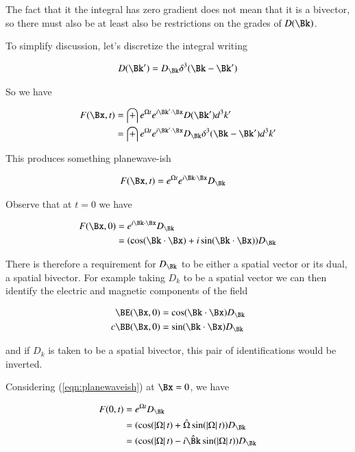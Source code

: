 The fact that it the integral has zero gradient does not mean that it is a bivector, so there must also be at least also be restrictions on the grades of $D(\Bk)$.

To simplify discussion, let's discretize the integral writing

\begin{align*}
D(\Bk') = D_\Bk \delta^3 (\Bk - \Bk')
\end{align*}

So we have

\begin{align*}
F(\Bx,t)
&= \int e^{\Omega t} e^{i \Bk' \cdot \Bx} D(\Bk') d^3 k' \\
&= \int e^{\Omega t} e^{i \Bk' \cdot \Bx} D_\Bk \delta^3(\Bk - \Bk') d^3 k' \\
\end{align*}

This produces something planewave-ish

\begin{align}\label{eqn:planewaveish}
F(\Bx,t) &= e^{\Omega t} e^{i \Bk \cdot \Bx} D_\Bk
\end{align}

Observe that at $t=0$ we have

\begin{align*}
F(\Bx,0)
&= e^{i \Bk \cdot \Bx} D_\Bk  \\
&= (\cos (\Bk \cdot \Bx) + i \sin(\Bk \cdot \Bx)) D_\Bk  \\
\end{align*}

There is therefore a requirement for $D_\Bk$ to be either a spatial vector or its dual, a spatial bivector.  For example taking $D_k$ to be a spatial vector we can then identify the electric and magnetic components of the field

\begin{align*}
\BE(\Bx,0) &= \cos (\Bk \cdot \Bx) D_\Bk \\
c \BB(\Bx,0) &= \sin (\Bk \cdot \Bx) D_\Bk
\end{align*}

and if $D_k$ is taken to be a spatial bivector, this pair of identifications would be inverted.

Considering (\ref{eqn:planewaveish}) at $\Bx=0$, we have

\begin{align*}
F(0, t)
&= e^{\Omega t} D_\Bk \\
&= (\cos(\Abs{\Omega} t) + \hat{\Omega} \sin(\Abs{\Omega} t)) D_\Bk \\
&= (\cos(\Abs{\Omega} t) - i \hat{\Bk} \sin(\Abs{\Omega} t)) D_\Bk \\
\end{align*}

